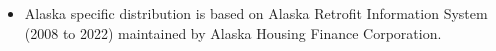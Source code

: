 \begin{itemize}
\item Alaska specific distribution is based on Alaska Retrofit Information System (2008 to 2022) maintained by Alaska Housing Finance Corporation.
\end{itemize}
